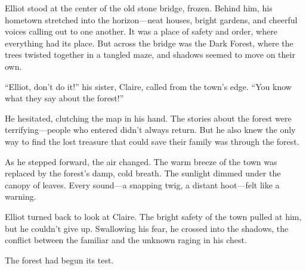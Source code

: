 \documentclass[12pt]{article}
\begin{document}
\vspace{1em}

\begin{tcolorbox}[colframe=black!60, colback=white, 
coltitle=black, colbacktitle=black!15, fonttitle=\bfseries\Large, 
title=Text: The Bridge Between Worlds, halign title=center, left=10pt, right=10pt, top=10pt, bottom=15pt]


Elliot stood at the center of the old stone bridge, frozen. Behind him, his hometown stretched into the horizon—neat houses, bright gardens, and cheerful voices calling out to one another. It was a place of safety and order, where everything had its place. But across the bridge was the Dark Forest, where the trees twisted together in a tangled maze, and shadows seemed to move on their own.

“Elliot, don’t do it!” his sister, Claire, called from the town’s edge. “You know what they say about the forest!”

He hesitated, clutching the map in his hand. The stories about the forest were terrifying—people who entered didn’t always return. But he also knew the only way to find the lost treasure that could save their family was through the forest.

As he stepped forward, the air changed. The warm breeze of the town was replaced by the forest’s damp, cold breath. The sunlight dimmed under the canopy of leaves. Every sound—a snapping twig, a distant hoot—felt like a warning.

Elliot turned back to look at Claire. The bright safety of the town pulled at him, but he couldn’t give up. Swallowing his fear, he crossed into the shadows, the conflict between the familiar and the unknown raging in his chest.

The forest had begun its test.

 

 

 

\end{tcolorbox}
\end{document}
